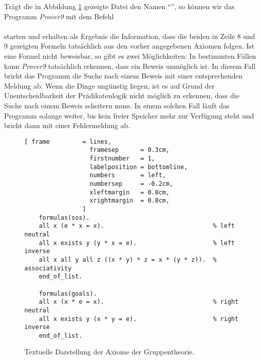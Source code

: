 Trägt die in Abbildung \ref{fig:group2.in} gezeigte Datei den Namen ``'', so können wir das
Programm \textsl{Prover9} mit dem Befehl 
\\[0.2cm]
\hspace*{1.3cm}
\\[0.2cm]
starten und erhalten als Ergebnis die Information, dass die beiden in Zeile 8 und 9 gezeigten Formeln
tatsächlich aus den vorher angegebenen Axiomen folgen.  Ist eine Formel nicht beweisbar, so gibt es zwei Möglichkeiten:
In bestimmten Fällen kann \textsl{Prover9} tatsächlich erkennen, dass ein Beweis unmöglich ist.  In
diesem Fall bricht das Programm die Suche nach einem Beweis mit einer entsprechenden Meldung ab.
Wenn die Dinge ungünstig liegen, ist es auf Grund der Unentscheidbarkeit der Prädikatenlogik nicht
möglich zu erkennen, dass die Suche nach einem Beweis scheitern muss.  In einem solchen Fall
läuft das Programm solange weiter, bis kein freier Speicher mehr zur Verfügung steht und
bricht dann mit einer Fehlermeldung ab.


\begin{figure}[!ht]
\centering
\begin{Verbatim}[ frame         = lines, 
                  framesep      = 0.3cm, 
                  firstnumber   = 1,
                  labelposition = bottomline,
                  numbers       = left,
                  numbersep     = -0.2cm,
                  xleftmargin   = 0.8cm,
                  xrightmargin  = 0.8cm,
                ]
    formulas(sos).
    all x (e * x = x).                              % left neutral 
    all x exists y (y * x = e).                     % left inverse
    all x all y all z ((x * y) * z = x * (y * z)).  % associativity
    end_of_list.
    
    formulas(goals).
    all x (x * e = x).                              % right neutral 
    all x exists y (x * y = e).                     % right inverse
    end_of_list.
\end{Verbatim}
\vspace*{-0.3cm}
\caption{Textuelle Darstellung der Axiome der Gruppentheorie.}
\label{fig:group2.in}
\end{figure}


